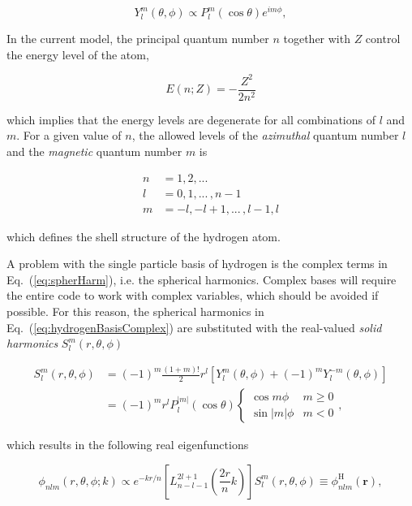 \begin{equation}
 Y_l^m(\theta, \phi) \propto   P_l^m(\cos\theta)e^{im\phi}, \label{eq:spherHarm}
\end{equation}

In the current model, the principal quantum number $n$ together with $Z$ control the energy level of the atom, 

\begin{equation}
 E(n; Z) = -\frac{Z^2}{2n^2}\label{eq:AtomNonIntEnergy}
\end{equation}

which implies that the energy levels are degenerate for all combinations of $l$ and $m$. For a given value of $n$, the allowed levels of the \textit{azimuthal} quantum number $l$ and the \textit{magnetic} quantum number $m$ is 

\begin{align*}
 n &= 1, 2, ... \\
 l &= 0, 1, ...\,, n-1 \\
 m &= -l, -l + 1, ...\,, l - 1, l
\end{align*}


which defines the shell structure of the hydrogen atom. 

A problem with the single particle basis of hydrogen is the complex terms in Eq.~(\ref{eq:spherHarm}), i.e. the spherical harmonics. Complex bases will require the entire code to work with complex variables, which should be avoided if possible. For this reason, the spherical harmonics in Eq.~(\ref{eq:hydrogenBasisComplex}) are substituted with the real-valued \textit{solid harmonics} $S_l^m(r, \theta, \phi)$  \cite{SolidHarmonics}

\begin{align}
S_l^m(r, \theta, \phi) &= (-1)^m\frac{(1+m)!}{2}r^l\left[Y_l^m(\theta, \phi) + (-1)^m Y_l^{-m}(\theta, \phi)\right] \\
 &= (-1)^m r^{l} P_l^{|m|}(\cos\theta) \begin{cases} \cos m\phi & m \ge 0 \\ \sin|m|\phi &  m < 0 \end{cases},                                                                                                     
\end{align}

which results in the following real eigenfunctions

\begin{equation}
  \phi_{nlm}(r, \theta, \phi; k) \propto e^{-kr/n}\left[L_{n-l-1}^{2l+1}\left(\frac{2r}{n}k\right)\right] S_l^m(r, \theta, \phi) \equiv \phi^\mathrm{H}_{nlm}(\mathbf{r}), \label{eq:hydrogenBasisReal}
\end{equation}

